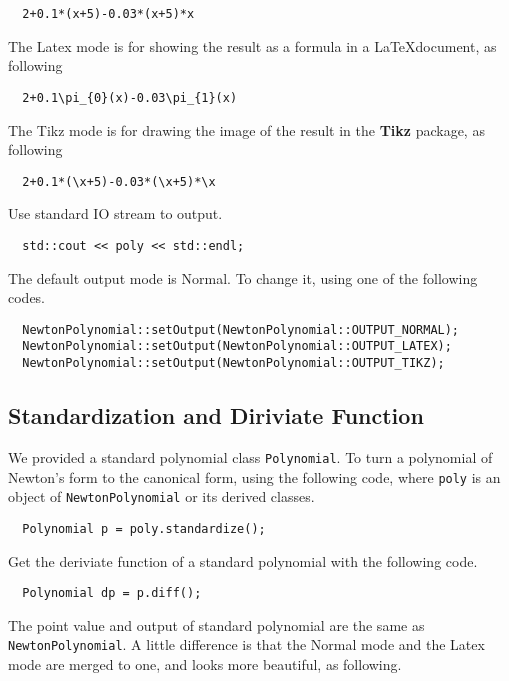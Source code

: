 \documentclass[11pt,en]{elegantpaper}
\begin{document}
\begin{lstlisting}
  2+0.1*(x+5)-0.03*(x+5)*x
\end{lstlisting}

The Latex mode is for showing the result as a formula in a \LaTeX document, as following

\begin{lstlisting}
  2+0.1\pi_{0}(x)-0.03\pi_{1}(x)
\end{lstlisting}

The Tikz mode is for drawing the image of the result in the \textbf{Tikz} package, as following

\begin{lstlisting}
  2+0.1*(\x+5)-0.03*(\x+5)*\x
\end{lstlisting}

Use standard IO stream to output.

\begin{lstlisting}
  std::cout << poly << std::endl;
\end{lstlisting}

The default output mode is Normal. To change it, using one of the following codes.

\begin{lstlisting}
  NewtonPolynomial::setOutput(NewtonPolynomial::OUTPUT_NORMAL);
  NewtonPolynomial::setOutput(NewtonPolynomial::OUTPUT_LATEX);
  NewtonPolynomial::setOutput(NewtonPolynomial::OUTPUT_TIKZ);
\end{lstlisting}

\subsection{Standardization and Diriviate Function}

We provided a standard polynomial class \verb|Polynomial|. To turn a polynomial of Newton's form to the canonical form, using the following code, where \verb|poly| is an object of \verb|NewtonPolynomial| or its derived classes.

\begin{lstlisting}
  Polynomial p = poly.standardize();
\end{lstlisting}

Get the deriviate function of a standard polynomial with the following code.

\begin{lstlisting}
  Polynomial dp = p.diff();
\end{lstlisting}

The point value and output of standard polynomial are the same as \verb|NewtonPolynomial|. A little difference is that the Normal mode and the Latex mode are merged to one, and looks more beautiful, as following.
\end{document}
